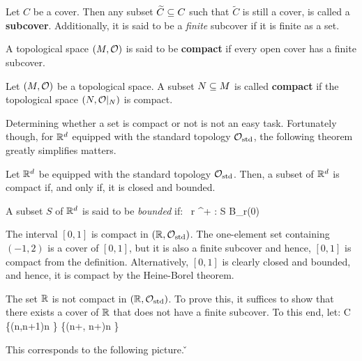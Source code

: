 \bd [Subcover]
Let $C$ be a cover. Then any subset $\widetilde{C}\subseteq C$ such that $\widetilde{C}$ is still a cover, is called a
\textbf{subcover}. Additionally, it is said to be a \emph{finite} subcover if it is finite as a set.
\ed

A topological space $(M,\mathcal{O})$ is said to be \textbf{compact} if every open cover has a finite subcover.
\ed

Let $(M,\mathcal{O})$ be a topological space. A subset $N\subseteq M$ is called \textbf{compact} if the topological space $(N,
\mathcal{O}|_N)$ is compact.
\ed

Determining whether a set is compact or not is not an easy task. Fortunately though, for $\mathbb{R}^d$ equipped with the
standard topology $\mathcal{O}_\mathrm{std}$, the following theorem greatly simplifies matters.

Let $\mathbb{R}^d$ be equipped with the standard topology $\mathcal{O}_\mathrm{std}$. Then, a subset of $\mathbb{R}^d$ is compact if, and
only if, it is closed and bounded.
\et

A subset $S$ of $\mathbb{R}^d$ is said to be \emph{bounded} if:
\bse
\exists \, r \in \R^+ : S \se B_r(0)
\ese

\be
The interval $[0,1]$ is compact in $(\mathbb{R},\mathcal{O}_\mathrm{std})$. The one-element set containing $(-1,2)$ is a cover of
$[0,1]$, but it is also a finite subcover and hence, $[0,1]$ is compact from the definition. Alternatively, $[0,1]$ is
clearly closed and bounded, and hence, it is compact by the Heine-Borel theorem.
\ee

\be
The set $\mathbb{R}$ is not compact in $(\mathbb{R},\mathcal{O}_\mathrm{std})$. To prove this, it suffices to show that there exists a cover
of $\mathbb{R}$ that does not have a finite subcover. To this end, let:
\bse
C \coloneqq \{(n,n+1)\mid n \in \Z\} \cup \{(n+, n+)\mid n \in \Z\}
\ese

This corresponds to the following picture. \v

\begin{figure}[H]
\centering
{}
\end{figure}

